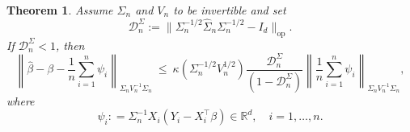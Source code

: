 \documentclass[11pt]{article}
\newtheorem{theorem}{Theorem}
\DeclareMathOperator*{\argmin}{argmin}
\begin{document}
%



\begin{theorem}\label{thm:Basic-deter-ineq}
Assume $\Sigma_n$ and $V_n$ to be invertible and set 
\begin{equation}\label{eq:Dn}
\mathcal{D}_n^{\Sigma} := \|\Sigma_n^{-1/2}\widehat{\Sigma}_n\Sigma_n^{-1/2} - I_d\|_{\mathrm{op}}.
\end{equation}
 If $\mathcal{D}_n^{\Sigma} < 1$, then 
\[
\left\|\widehat{\beta} - \beta - \frac{1}{n}\sum_{i=1}^n \psi_i \right\|_{\Sigma_n V^{-1}_n\Sigma_n} ~\le~ \kappa(\Sigma_n^{-1/2}V_n^{1/2})\frac{\mathcal{D}_n^{\Sigma}}{(1 - \mathcal{D}_n^{\Sigma})}\left\|\frac{1}{n}\sum_{i=1}^n \psi_i \right\|_{\Sigma_n V^{-1}_n\Sigma_n},
\]
where 
\[
\psi_i : = \Sigma^{-1}_nX_i(Y_i - X_i^{\top}\beta) \in \mathbb{R}^d, \quad i=1,\ldots,n.
\]
\end{theorem}
\end{document}
